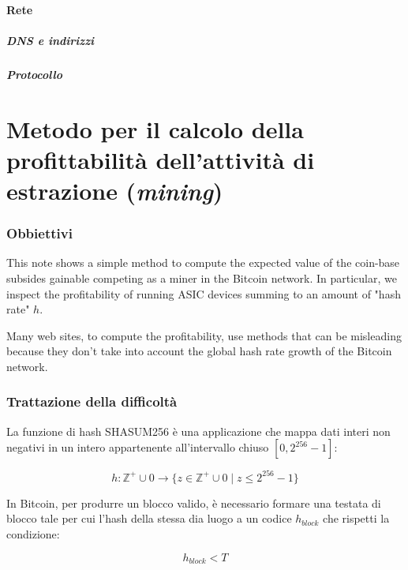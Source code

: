 \documentclass{article}
\begin{document}
\newpage
\subsection{Rete}
\subsubsection{DNS e indirizzi}
\subsubsection{Protocollo}

\newpage
\part{Metodo per il calcolo della profittabilità dell'attività di estrazione (\textit{mining})}

\section{Obbiettivi}

This note shows a simple method to compute the expected value of the coin-base subsides gainable competing as a miner in the Bitcoin network.
In particular, we inspect the profitability of running ASIC devices summing to an amount of "hash rate" $h$.

Many web sites, to compute the profitability, use methods that can be misleading because they don't take into account the global hash rate growth of the Bitcoin network.

\section{Trattazione della difficoltà}

La funzione di hash SHASUM256 è una applicazione che mappa dati interi non negativi in un intero appartenente all'intervallo chiuso $ \left [0, 2^{256} - 1 \right ]$:

\begin{equation}
    h: \mathbb{Z}^{+} \cup {0} \rightarrow \{ z \in \mathbb{Z}^{+} \cup {0} \mid z  \leq 2^{256} - 1 \} \label{applicazione_hash}
\end{equation}

In Bitcoin, per produrre un blocco valido, è necessario formare una testata di blocco tale per cui l'hash della stessa dia luogo a un codice $h_{block}$ che rispetti la condizione:

\begin{equation}
    h_{block} < T \label{condizione_hash}
\end{equation}
\end{document}
